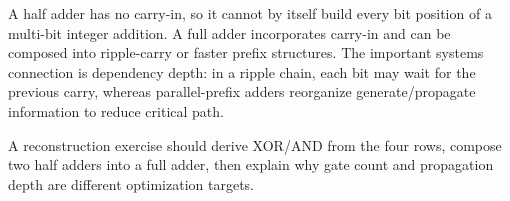 A half adder has no carry-in, so it cannot by itself build every bit position of a multi-bit integer addition. A full adder incorporates carry-in and can be composed into ripple-carry or faster prefix structures. The important systems connection is dependency depth: in a ripple chain, each bit may wait for the previous carry, whereas parallel-prefix adders reorganize generate/propagate information to reduce critical path.

A reconstruction exercise should derive XOR/AND from the four rows, compose two half adders into a full adder, then explain why gate count and propagation depth are different optimization targets.
